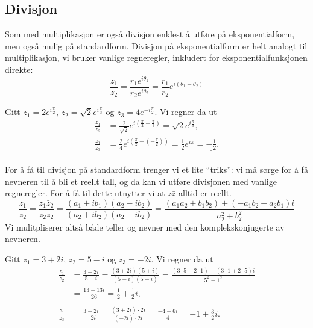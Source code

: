 \documentclass[a4paper,norsk,12pt]{article}
\newcommand{\ans}[1]{\underline{\underline{#1}}}
\newcounter{exa}
\begin{document}
\subsection{Divisjon}
Som med multiplikasjon er også divisjon enklest å utføre på eksponentialform, men også mulig på standardform. Divisjon på eksponentialform er helt analogt til multiplikasjon, vi bruker vanlige regneregler, inkludert for eksponentialfunksjonen direkte:
\begin{displaymath}
	\frac{z_1}{z_2} = \frac{r_1e^{i\theta_1}}{r_2e^{i\theta_2}} = \frac{r_1}{r_2}e^{i(\theta_1-\theta_2)}
\end{displaymath}
\begin{texample}
Gitt $z_1 = 2e^{ i\frac{\pi}{2}}$, $z_2 = \sqrt{2}e^{i\frac{\pi}{3}}$ og $z_3 = 4e^{-i\frac{\pi}{2}}$. Vi regner da ut
\begin{align*}
	\frac{z_1}{z_2} &= \frac{2}{\sqrt{2}}e^{i\left(\frac{\pi}{2}-\frac{\pi}{3}\right)} = \ans{\sqrt{2}e^{i\frac{\pi}{6}}}, \\
	\frac{z_1}{z_3} &= \frac{2}{4}e^{i\left(\frac{\pi}{2}-\left(-\frac{\pi}{2}\right)\right)} = \frac12e^{i\pi} = \ans{-\frac12}.
\end{align*}
\end{texample}
For å få til divisjon på standardform trenger vi et lite ``triks'': vi må sørge for å få nevneren til å bli et reellt tall, og da kan vi utføre divisjonen med vanlige regneregler. For å få til dette utnytter vi at $z\bar{z}$ alltid er reellt.
\begin{displaymath}
	\frac{z_1}{z_2} = \frac{z_1\bar{z}_2}{z_2\bar{z}_2} = \frac{(a_1+ib_1)(a_2-ib_2)}{(a_2+ib_2)(a_2-ib_2)} = \frac{(a_1a_2+b_1b_2)+(-a_1b_2+a_2b_1)i}{a_2^2+b_2^2}
\end{displaymath}
Vi mulitpliserer altså både teller og nevner med den komplekskonjugerte av nevneren.
\begin{texample}
Gitt $z_1 = 3+2i$, $z_2 = 5-i$ og $z_3 = -2i$. Vi regner da ut
\begin{align*}
	\frac{z_1}{z_2} &= \frac{3+2i}{5-i} = \frac{(3+2i)(5+i)}{(5-i)(5+i)} = \frac{(3\cdot5-2\cdot1) + (3\cdot1+2\cdot5)i}{5^2+1^2} \\
	&= \frac{13 + 13i}{26} = \ans{\frac12 + \frac12 i}, \\[12pt]
	\frac{z_1}{z_3} &= \frac{3+2i}{-2i} = \frac{(3+2i)\cdot2i}{(-2i)\cdot 2i} = \frac{-4+6i}{4} = \ans{-1+\frac{3}{2}i}.
\end{align*}
\end{texample}
\end{document}
